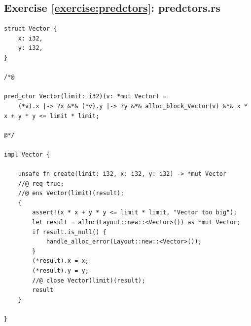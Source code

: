\documentclass{article}
\begin{document}
\subsection{Exercise \ref{exercise:predctors}:
predctors.rs}\label{solution:predctors}

\begin{lstlisting}
struct Vector {
    x: i32,
    y: i32,
}

/*@

pred_ctor Vector(limit: i32)(v: *mut Vector) =
    (*v).x |-> ?x &*& (*v).y |-> ?y &*& alloc_block_Vector(v) &*& x * x + y * y <= limit * limit;

@*/

impl Vector {

    unsafe fn create(limit: i32, x: i32, y: i32) -> *mut Vector
    //@ req true;
    //@ ens Vector(limit)(result);
    {
        assert!(x * x + y * y <= limit * limit, "Vector too big");
        let result = alloc(Layout::new::<Vector>()) as *mut Vector;
        if result.is_null() {
            handle_alloc_error(Layout::new::<Vector>());
        }
        (*result).x = x;
        (*result).y = y;
        //@ close Vector(limit)(result);
        result
    }
    
}


\end{lstlisting}
\end{document}
